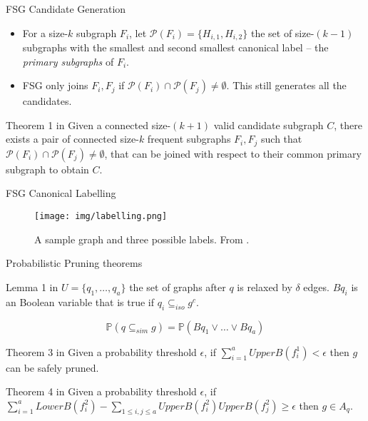 \documentclass[10pt, aspectratio=149]{beamer}
\begin{document}
\begin{frame}{FSG Candidate Generation}
    \begin{itemize}
        \item For a size-$k$ subgraph $F_i$, let $\mathcal{P}(F_i) = \{ H_{i,1}, H_{i,2} \}$ the set of size-$(k-1)$ subgraphs with the smallest and second smallest canonical label – the \textit{primary subgraphs} of $F_i$.
        
        \item FSG only joins $F_i, F_j$ if $\mathcal{P}(F_i) \cap \mathcal{P}(F_j) \neq \emptyset$. This still generates all the candidates.
    \end{itemize}

    \begin{block}{Theorem 1 in \cite{FSG}}
      Given a connected size-$(k+1)$ valid candidate subgraph $C$, there exists a pair of connected size-$k$ frequent subgraphs $F_i, F_j$ such that $\mathcal{P}(F_i) \cap \mathcal{P}(F_j) \neq \emptyset$, that can be joined with respect to their common primary subgraph to obtain $C$.
    \end{block}
\end{frame}

\begin{frame}{FSG Canonical Labelling}
\begin{figure}
    \centering
    \texttt{[image: img/labelling.png]}
    \caption{A sample graph and three possible labels. From \cite{FSG}.}
\end{figure}
\end{frame}


\begin{frame}{Probabilistic Pruning theorems}

    \begin{block}{Lemma 1 in \cite{sim}}
      $U = \{q_1, \ldots, q_a\}$ the set of graphs after $q$ is relaxed by $\delta$ edges. $Bq_i$ is an Boolean variable that is true if $q_i \subseteq_{iso} g^c$.
      
      $$
      \mathbb{P}(q \subseteq_{sim} g) = \mathbb{P}(Bq_1 \vee \ldots \vee Bq_a)
      $$
    \end{block}
    
       \begin{block}{Theorem 3 in \cite{sim}}
      Given a probability threshold $\epsilon$, if $\sum_{i=1}^a UpperB(f_i^1) < \epsilon$ then $g$ can be safely pruned.
    \end{block}
    
       \begin{block}{Theorem 4 in \cite{sim}}
      Given a probability threshold $\epsilon$, if $\sum_{i=1}^a LowerB(f_i^2) -  \sum_{1\leq i,j \leq a} UpperB(f_i^2)UpperB(f_j^2) \geq \epsilon$ then $g \in A_q$.
    \end{block}
\end{frame}
\end{document}
